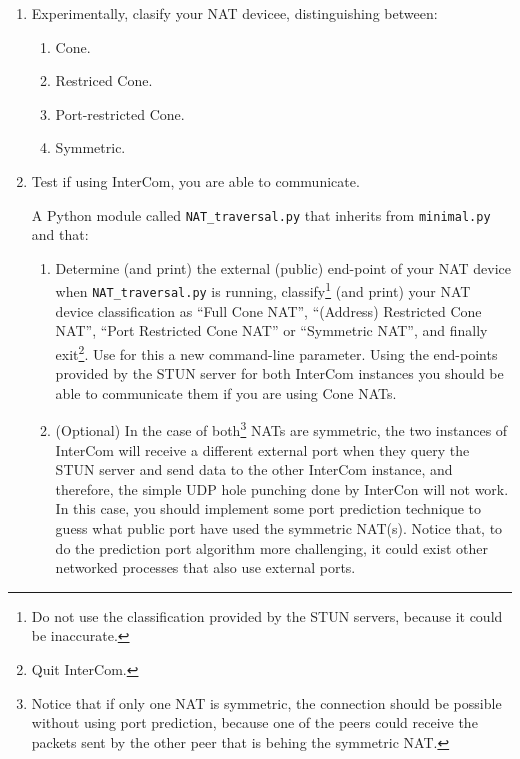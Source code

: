 \begin{enumerate}
\item Experimentally, clasify your NAT devicee, distinguishing between:
\begin{enumerate}
\item Cone.
\item Restriced Cone.
\item Port-restricted Cone.
\item Symmetric.
\end{enumerate}
\item Test if using InterCom, you are able to communicate.
  
A Python module called \texttt{NAT\_traversal.py} that inherits from
\texttt{minimal.py} and that:
\begin{enumerate}
\item Determine (and print) the external (public) end-point of your
  NAT device when \texttt{NAT\_traversal.py} is running,
  classify\footnote{Do not use the classification provided by the STUN
    servers, because it could be inaccurate.} (and print) your NAT
  device classification as ``Full Cone NAT'', ``(Address) Restricted
  Cone NAT'', ``Port Restricted Cone NAT'' or ``Symmetric NAT'', and
  finally exit\footnote{Quit InterCom.}. Use for this a new
  command-line parameter. Using the end-points provided by the STUN
  server for both InterCom instances you should be able to communicate
  them if you are using Cone NATs.
\item (Optional) In the case of both\footnote{Notice that if only one
NAT is symmetric, the connection should be possible without using port
prediction, because one of the peers could receive the packets sent by
the other peer that is behing the symmetric NAT.} NATs are symmetric,
  the two instances of InterCom will receive a different external port
  when they query the STUN server and send data to the other InterCom
  instance, and therefore, the simple UDP hole punching done by
  InterCon will not work. In this case, you should implement some port
  prediction technique to guess what public port have used the
  symmetric NAT(s). Notice that, to do the prediction port algorithm
  more challenging, it could exist other networked processes that also
  use external ports.
\end{enumerate}


\end{enumerate}
